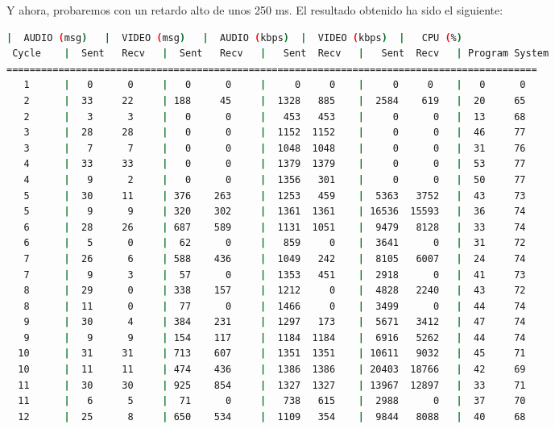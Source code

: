 Y ahora, probaremos con un retardo alto de unos 250 ms. El resultado obtenido ha sido el siguiente:
\vspace{\baselineskip}

\begin{adjustbox}{max width=\textwidth}
\begin{lstlisting}[language=bash,basicstyle=\ttfamily\scriptsize]
          |  AUDIO (msg)   |  VIDEO (msg)   |  AUDIO (kbps)  |  VIDEO (kbps)  |   CPU (%)
 Cycle    |  Sent   Recv   |  Sent   Recv   |   Sent  Recv   |   Sent  Recv   | Program System
============================================================================================
   1      |   0      0     |   0      0     |     0     0    |     0     0    |   0      0
   2      |  33     22     | 188     45     |  1328   885    |  2584    619   |  20     65
   2      |   3      3     |   0      0     |   453   453    |     0      0   |  13     68
   3      |  28     28     |   0      0     |  1152  1152    |     0      0   |  46     77
   3      |   7      7     |   0      0     |  1048  1048    |     0      0   |  31     76
   4      |  33     33     |   0      0     |  1379  1379    |     0      0   |  53     77
   4      |   9      2     |   0      0     |  1356   301    |     0      0   |  50     77
   5      |  30     11     | 376    263     |  1253   459    |  5363   3752   |  43     73
   5      |   9      9     | 320    302     |  1361  1361    | 16536  15593   |  36     74
   6      |  28     26     | 687    589     |  1131  1051    |  9479   8128   |  33     74
   6      |   5      0     |  62      0     |   859     0    |  3641      0   |  31     72
   7      |  26      6     | 588    436     |  1049   242    |  8105   6007   |  24     74
   7      |   9      3     |  57      0     |  1353   451    |  2918      0   |  41     73
   8      |  29      0     | 338    157     |  1212     0    |  4828   2240   |  43     72
   8      |  11      0     |  77      0     |  1466     0    |  3499      0   |  44     74
   9      |  30      4     | 384    231     |  1297   173    |  5671   3412   |  47     74
   9      |   9      9     | 154    117     |  1184  1184    |  6916   5262   |  44     74
  10      |  31     31     | 713    607     |  1351  1351    | 10611   9032   |  45     71
  10      |  11     11     | 474    436     |  1386  1386    | 20403  18766   |  42     69
  11      |  30     30     | 925    854     |  1327  1327    | 13967  12897   |  33     71
  11      |   6      5     |  71      0     |   738   615    |  2988      0   |  37     70
  12      |  25      8     | 650    534     |  1109   354    |  9844   8088   |  40     68

\end{lstlisting}
\end{adjustbox}
